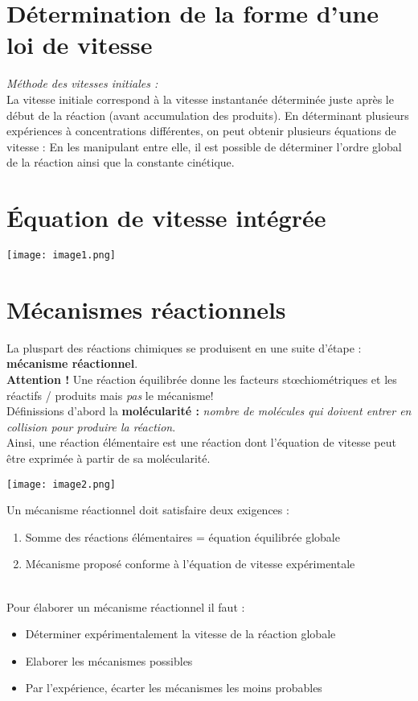 \documentclass[british,french,11pt, a4paper, openany]{book}
\begin{document}
\section{Détermination de la forme d'une loi de vitesse}
\textit{Méthode des vitesses initiales :}\\
La vitesse initiale correspond à la vitesse instantanée déterminée juste après le début de la réaction (avant accumulation des produits). En déterminant plusieurs expériences à concentrations différentes, on peut obtenir plusieurs équations de vitesse :  En les manipulant entre elle, il est possible de déterminer l'ordre global de la réaction ainsi que la constante cinétique.
\section{Équation de vitesse intégrée}
\begin{center}
	\texttt{[image: image1.png]}\\
\end{center}
\section{Mécanismes réactionnels}
La pluspart des réactions chimiques se produisent en une suite d'étape : \textbf{mécanisme réactionnel}.\\

\textbf{Attention !} Une réaction équilibrée donne les facteurs stœchiométriques et les réactifs / produits mais \textit{pas} le mécanisme!
\\
Définissions d'abord la \textbf{molécularité :} \textit{nombre de molécules qui doivent entrer en collision pour produire la réaction}.\\
Ainsi, une réaction élémentaire est une réaction dont l'équation de vitesse peut être exprimée à partir de sa molécularité.
\begin{center}
	\texttt{[image: image2.png]}\\
\end{center}

Un mécanisme réactionnel doit satisfaire deux exigences :
\begin{enumerate}
	\item Somme des réactions élémentaires = équation équilibrée globale
	\item Mécanisme proposé conforme à l'équation de vitesse expérimentale
\end{enumerate}\ \\
Pour élaborer un mécanisme réactionnel il faut :
\begin{itemize}
	\item Déterminer expérimentalement la vitesse de la réaction globale
	\item Elaborer les mécanismes possibles
	\item Par l'expérience, écarter les mécanismes les moins probables
\end{itemize}
\end{document}
